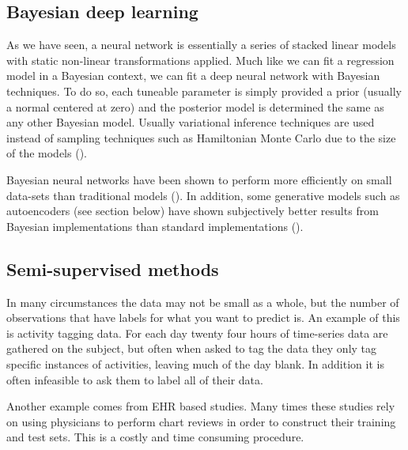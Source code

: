 \documentclass[]{book}
\theoremstyle{definition}
\theoremstyle{definition}
\theoremstyle{definition}
\theoremstyle{remark}
\begin{document}
\subsection{Bayesian deep learning}\label{bayesian-deep-learning}

As we have seen, a neural network is essentially a series of stacked
linear models with static non-linear transformations applied. Much like
we can fit a regression model in a Bayesian context, we can fit a deep
neural network with Bayesian techniques. To do so, each tuneable
parameter is simply provided a prior (usually a normal centered at zero)
and the posterior model is determined the same as any other Bayesian
model. Usually variational inference techniques are used instead of
sampling techniques such as Hamiltonian Monte Carlo due to the size of
the models (\citet{bayesnets}).

Bayesian neural networks have been shown to perform more efficiently on
small data-sets than traditional models (\citet{dropout}). In addition,
some generative models such as autoencoders (see section below) have
shown subjectively better results from Bayesian implementations than
standard implementations (\citet{variational_autoencoders}).

\subsection{Semi-supervised methods}\label{semi-supervised-methods}

In many circumstances the data may not be small as a whole, but the
number of observations that have labels for what you want to predict is.
An example of this is activity tagging data. For each day twenty four
hours of time-series data are gathered on the subject, but often when
asked to tag the data they only tag specific instances of activities,
leaving much of the day blank. In addition it is often infeasible to ask
them to label all of their data.

Another example comes from EHR based studies. Many times these studies
rely on using physicians to perform chart reviews in order to construct
their training and test sets. This is a costly and time consuming
procedure.
\end{document}
